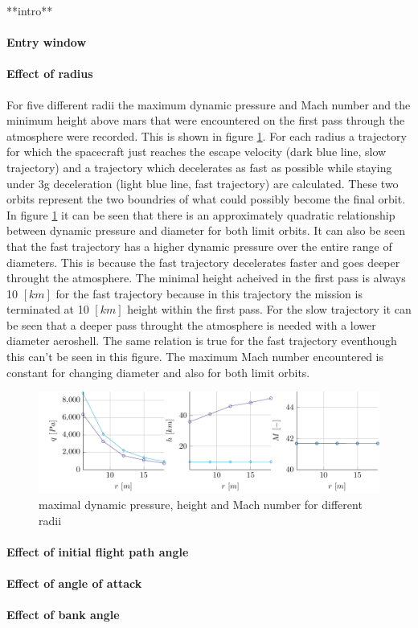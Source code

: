 **intro**

\paragraph{Entry window}

\paragraph{Effect of radius}

For five different radii the maximum dynamic pressure and Mach number and the minimum height above mars that were encountered on the first pass through the atmosphere were recorded. This is shown in figure \ref{fig:radius}. For each radius a trajectory for which the spacecraft just reaches the escape velocity (dark blue line, slow trajectory) and a trajectory which decelerates as fast as possible while staying under 3g deceleration (light blue line, fast trajectory) are calculated. These two orbits represent the two boundries of what could possibly become the final orbit. In figure \ref{fig:radius} it can be seen that there is an approximately quadratic relationship between dynamic pressure and diameter for both limit orbits. It can also be seen that the fast trajectory has a higher dynamic pressure over the entire range of diameters. This is because the fast trajectory decelerates faster and goes deeper throught the atmosphere. The minimal height acheived in the first pass is always 10 $\left[km\right]$ for the fast trajectory because in this trajectory the mission is terminated at 10 $\left[km\right]$ height within the first pass. For the slow trajectory it can be seen that a deeper pass throught the atmosphere is needed with a lower diameter aeroshell. The same relation is true for the fast trajectory eventhough this can't be seen in this figure. The maximum Mach number encountered is constant for changing diameter and also for both limit orbits.

\begin{figure}[H]
	\centering
	\includegraphics[width=1\textwidth]{./Figure/radius_param.pdf}
	\caption{maximal dynamic pressure, height and Mach number for different radii}
	\label{fig:radius}
\end{figure}

\paragraph{Effect of initial flight path angle}

\paragraph{Effect of angle of attack}

\paragraph{Effect of bank angle}



